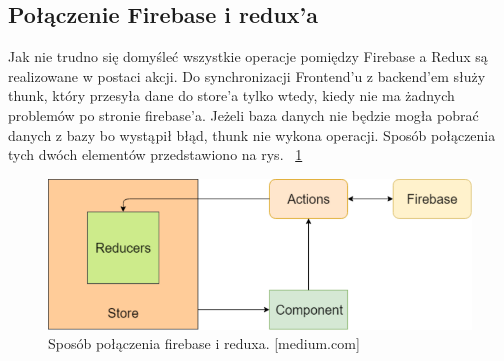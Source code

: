 \subsection{Połączenie Firebase i redux’a
}

Jak nie trudno się domyśleć wszystkie operacje pomiędzy Firebase a Redux są realizowane w postaci akcji.
Do synchronizacji Frontend’u z backend’em służy thunk,
który przesyła dane do store’a tylko wtedy,
kiedy nie ma żadnych problemów po stronie firebase’a.
Jeżeli baza danych nie będzie mogła pobrać danych z bazy bo wystąpił błąd,
thunk nie wykona operacji. Sposób połączenia tych dwóch elementów przedstawiono na rys. 
~\ref{rys:fireRedux} 

\begin{figure}
	\centering\includegraphics[width=.6\textwidth]{img/fireRedux}
	\caption{Sposób połączenia firebase i reduxa. [medium.com]}\label{rys:fireRedux}%
\end{figure}

